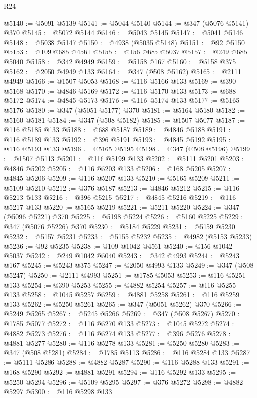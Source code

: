 \begin{lexlean}{R24}
\begin{coremodule}
@5140 := @5091 @5139
@5141 := @5044 @5140
@5144 := @347 (@5076 @5141) @370
@5145 := @5072 @5144
@5146 := @5043 @5145
@5147 := @5041 @5146
@5148 := @5038 @5147
@5150 := @4938 (@5035 @5148)
@5151 := @92 @5150
@5153 := @109 @685 @4561
@5155 := @156 @685 @5037
@5157 := @249 @685 @5040
@5158 := @342 @4949
@5159 := @5158 @167
@5160 := @5158 @375
@5162 := @2050 @4949 @133
@5164 := @347 (@508 @5162)
@5165 := @2111 @4949
@5166 := @1507 @5053
@5168 := @116 @5166 @133
@5169 := @390 @5168
@5170 := @4846 @5169
@5172 := @116 @5170 @133
@5173 := @688 @5172
@5174 := @4845 @5173
@5176 := @116 @5174 @133
@5177 := @5165 @5176
@5180 := @347 (@5051 @5177) @370
@5181 := @5164 @5180
@5182 := @5160 @5181
@5184 := @347 (@508 @5182)
@5185 := @1507 @5077
@5187 := @116 @5185 @133
@5188 := @688 @5187
@5189 := @4846 @5188
@5191 := @116 @5189 @133
@5192 := @396 @5191
@5193 := @4845 @5192
@5195 := @116 @5193 @133
@5196 := @5165 @5195
@5198 := @347 (@508 @5196)
@5199 := @1507 @5113
@5201 := @116 @5199 @133
@5202 := @5111 @5201
@5203 := @4846 @5202
@5205 := @116 @5203 @133
@5206 := @168 @5205
@5207 := @4845 @5206
@5209 := @116 @5207 @133
@5210 := @5165 @5209
@5211 := @5109 @5210
@5212 := @376 @5187
@5213 := @4846 @5212
@5215 := @116 @5213 @133
@5216 := @396 @5215
@5217 := @4845 @5216
@5219 := @116 @5217 @133
@5220 := @5165 @5219
@5221 := @5211 @5220
@5224 := @347 (@5096 @5221) @370
@5225 := @5198 @5224
@5226 := @5160 @5225
@5229 := @347 (@5076 @5226) @370
@5230 := @5184 @5229
@5231 := @5159 @5230
@5232 := @5157 @5231
@5233 := @5155 @5232
@5235 := @4982 (@5153 @5233)
@5236 := @92 @5235
@5238 := @109 @1042 @4561
@5240 := @156 @1042 @5037
@5242 := @249 @1042 @5040
@5243 := @342 @4993
@5244 := @5243 @167
@5245 := @5243 @375
@5247 := @2050 @4993 @133
@5249 := @347 (@508 @5247)
@5250 := @2111 @4993
@5251 := @1785 @5053
@5253 := @116 @5251 @133
@5254 := @390 @5253
@5255 := @4882 @5254
@5257 := @116 @5255 @133
@5258 := @1045 @5257
@5259 := @4881 @5258
@5261 := @116 @5259 @133
@5262 := @5250 @5261
@5265 := @347 (@5051 @5262) @370
@5266 := @5249 @5265
@5267 := @5245 @5266
@5269 := @347 (@508 @5267)
@5270 := @1785 @5077
@5272 := @116 @5270 @133
@5273 := @1045 @5272
@5274 := @4882 @5273
@5276 := @116 @5274 @133
@5277 := @396 @5276
@5278 := @4881 @5277
@5280 := @116 @5278 @133
@5281 := @5250 @5280
@5283 := @347 (@508 @5281)
@5284 := @1785 @5113
@5286 := @116 @5284 @133
@5287 := @5111 @5286
@5288 := @4882 @5287
@5290 := @116 @5288 @133
@5291 := @168 @5290
@5292 := @4881 @5291
@5294 := @116 @5292 @133
@5295 := @5250 @5294
@5296 := @5109 @5295
@5297 := @376 @5272
@5298 := @4882 @5297
@5300 := @116 @5298 @133

\end{coremodule}
\end{lexlean}
